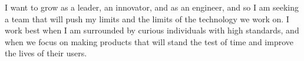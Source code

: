 
I want to grow as a leader, an innovator, and as an engineer, and so I am seeking a team that will push my limits and the limits of the technology we work on. I work best when I am surrounded by curious individuals with high standards, and when we focus on making products that will stand the test of time and improve the lives of their users.